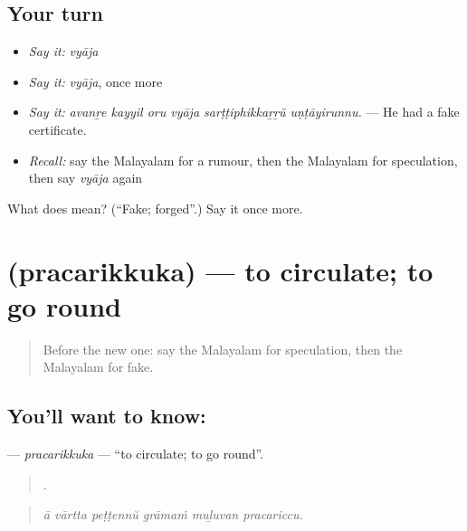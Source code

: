 \subsection*{Your turn}
\begin{itemize}
\raggedright
  \item \emph{Say it:} \emph{vyāja}
  \item \emph{Say it:} \emph{vyāja}, once more
  \item \emph{Say it:} \emph{avanṟe kayyil oru vyāja sarṭṭiphikkaṟṟŭ uṇṭāyirunnu.} — He had a fake certificate.
  \item \emph{Recall:} say the Malayalam for a rumour, then the Malayalam for speculation, then say \emph{vyāja} again
\end{itemize}

\begin{tcolorbox}[breakable,colback=teal!4,colframe=teal!35!black,title={Before you move on}]
What does  mean? (\textquotedblleft{}Fake; forged\textquotedblright{}.) Say it once more.
\end{tcolorbox}
\section[\texorpdfstring{\ml{പ്രചരിക്കുക} (pracarikkuka)}{പ്രചരിക്കുക (pracarikkuka)}]{ (pracarikkuka) — to circulate; to go round}

\label{lesson:ML-C353-pracarikkuka}



\begin{quote}
Before the new one: say the Malayalam for speculation, then the Malayalam for fake.
\end{quote}

\subsection*{You'll want to know: }
\textbf{} — \emph{pracarikkuka} — \textquotedblleft{}to circulate; to go round\textquotedblright{}.

\begin{quote}
     .
\end{quote}

\begin{quote}
\emph{ā vārtta peṭṭennŭ grāmaṁ muḻuvan pracariccu.}
\end{quote}

